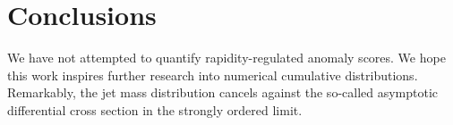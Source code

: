 \section{Conclusions}\label{sec:conclusions}

We have not attempted to quantify rapidity-regulated anomaly scores. We
hope this work inspires further research into numerical cumulative
distributions. Remarkably, the jet mass distribution cancels against the
so-called asymptotic differential cross section in the strongly ordered
limit.

